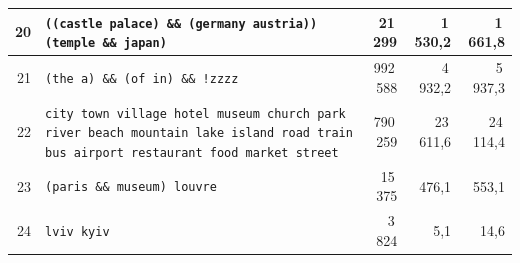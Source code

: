 \begin{longtable}{|r|p{}|r|r|r|}
\hline
20 & \texttt{((castle \textbar{}\textbar{} palace) \&\& (germany \textbar{}\textbar{} austria)) \textbar{}\textbar{} (temple \&\& japan)} & 21\,299 & 1\,530,2 & 1\,661,8 \\
\hline
21 & \texttt{(the \textbar{}\textbar{} a) \&\& (of \textbar{}\textbar{} in) \&\& !zzzz} & 992\,588 & 4\,932,2 & 5\,937,3 \\
\hline
22 & \texttt{city \textbar{}\textbar{} town \textbar{}\textbar{} village \textbar{}\textbar{} hotel \textbar{}\textbar{} museum \textbar{}\textbar{} church \textbar{}\textbar{} park \textbar{}\textbar{} river \textbar{}\textbar{} beach \textbar{}\textbar{} mountain \textbar{}\textbar{} lake \textbar{}\textbar{} island \textbar{}\textbar{} road \textbar{}\textbar{} train \textbar{}\textbar{} bus \textbar{}\textbar{} airport \textbar{}\textbar{} restaurant \textbar{}\textbar{} food \textbar{}\textbar{} market \textbar{}\textbar{} street} & 790\,259 & 23\,611,6 & 24\,114,4 \\
\hline
23 & \texttt{(paris \&\& museum) \textbar{}\textbar{} louvre} & 15\,375 & 476,1 & 553,1 \\
\hline
24 & \texttt{lviv \textbar{}\textbar{} kyiv} & 3\,824 & 5,1 & 14,6 \\
\hline
\end{longtable}
